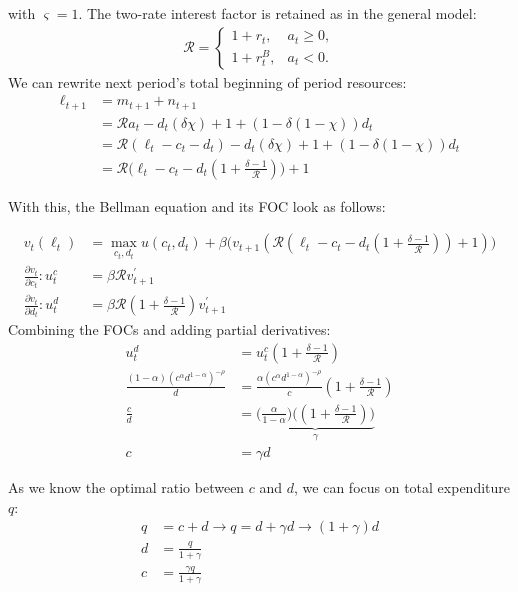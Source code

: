 \documentclass[\econtexMain]{subfiles}
\begin{document}
with $\varsigma = 1$. The two-rate interest factor is retained as in the general model:
\begin{align}
\mathcal{R} = 
\begin{cases}
	1+r_t, & a_t \ge 0,\\
	1+r_t^B, & a_t < 0.
\end{cases}
\end{align}
We can rewrite next period's total beginning of period resources:
\begin{align}
	\ell_{t+1} &= m_{t+1} + n_{t+1}\\
	&= \mathcal{R}a_t - d_t (\delta \chi) + 1 +(1-\delta(1 - \chi))d_t\\
	&=  \mathcal{R}(\ell_t - c_t - d_t) - d_t (\delta \chi) + 1 + (1-\delta(1 - \chi))d_t\\
	&= \mathcal{R}\Big(\ell_t - c_t - d_t (1 + \frac{\delta - 1}{\mathcal{R}})\Big) + 1 
\end{align}

With this, the Bellman equation and its FOC look as follows:

\begin{align}
	v_t(\ell_t) &= \max_{c_t,d_t} u(c_t,d_t) + \beta \Big(v_{t+1}\left(\mathcal{R}\left(\ell_t - c_t - d_t \left(1 + \frac{\delta - 1}{\mathcal{R}}\right)\right) + 1\right)\Big)\\
	\frac{\partial v_t}{\partial c_t}: u_t^{c} &= \beta \mathcal{R} v^{'}_{t+1}\\
	\frac{\partial v_t}{\partial d_t}: u_t^{d} &= \beta \mathcal{R} \left(1 + \frac{\delta - 1}{\mathcal{R}}\right) v^{'}_{t+1}
\end{align}
Combining the FOCs and adding partial derivatives: 
\begin{align}
	u_t^{d} &= u_t^{c} (1 + \frac{\delta - 1}{\mathcal{R}})\\
	\frac{(1 - \alpha) (c^\alpha d^{1 - \alpha})^{-\rho}}{d} &= \frac{\alpha (c^\alpha d^{1 - \alpha})^{-\rho}}{c}\left(1 + \frac{\delta - 1}{\mathcal{R}}\right)\\
	\frac{c}{d} &= \underbrace{\Big(\frac{\alpha}{1 - \alpha}\Big) \Big((1 + \frac{\delta - 1}{\mathcal{R}})\Big)}_{\gamma}\\
	c &= \gamma d
\end{align}


As we know the optimal ratio between $c$ and $d$, we can focus on total expenditure $q$:
\begin{align}
	q &= c + d \to q = d + \gamma d \to (1 + \gamma)d \\
	d &= \frac{q}{1 + \gamma} \label{eq:d_of_q} \\
	c &= \frac{\gamma q}{1 + \gamma} \label{eq:c_of_q}
\end{align}
\end{document}
